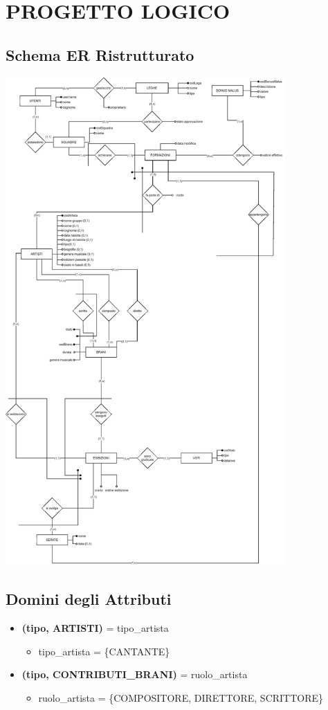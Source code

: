 \documentclass[a4paper,12pt]{article}
\begin{document}
\newpage
\section{PROGETTO LOGICO}
\subsection{Schema ER Ristrutturato}
\begin{center}
	\includegraphics[width=0.8\textwidth]{schema_ER_ristrutturato.eps}
\end{center}

\subsection{Domini degli Attributi}
\begin{itemize}
	\item \textbf{(tipo, ARTISTI)} = tipo\_artista
	\begin{itemize}
		\item tipo\_artista = \{CANTANTE\}
	\end{itemize}
	\item \textbf{(tipo, CONTRIBUTI\_BRANI)} = ruolo\_artista
	\begin{itemize}
		\item ruolo\_artista = \{COMPOSITORE, DIRETTORE, SCRITTORE\}
	\end{itemize}
\end{itemize}
\end{document}
